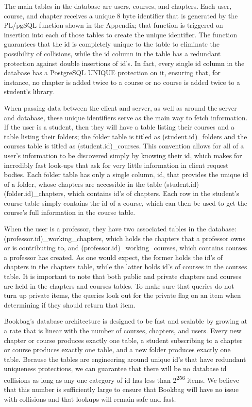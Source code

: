 \documentclass[pageno]{jpaper}
\begin{document}
The main tables in the database are users, courses, and chapters. Each user, course, and chapter receives a unique 8 byte identifier that is generated by the PL/pgSQL function shown in the Appendix; that function is triggered on insertion into each of those tables to create the unique identifier. The function guarantees that the id is completely unique to the table to eliminate the possibility of collisions, while the id column in the table has a redundant protection against double insertions of id's. In fact, every single id column in the database has a PostgreSQL UNIQUE protection on it, ensuring that, for instance, no chapter is added twice to a course or no course is added twice to a student's library.

When passing data between the client and server, as well as around the server and database, these unique identifiers serve as the main way to fetch information. If the user is a student, then they will have a table listing their courses and a table listing their folders; the folder table is titled as (student.id)\_folders and the courses table is titled as (student.id)\_courses. This convention allows for all of a user's information to be discovered simply by knowing their id, which makes for incredibly fast look-ups that ask for very little information in client request bodies. Each folder table has only a single column, id, that provides the unique id of a folder, whose chapters are accessible in the table (student.id)(folder.id)\_chapters, which contains id's of chapters. Each row in the student's course table simply contains the id of a course, which can then be used to get the course's full information in the course table.

When the user is a professor, they have two associated tables in the database: (professor.id)\_working\_chapters, which holds the chapters that a professor owns or is contributing to, and (professor.id)\_working\_courses, which contains courses a professor has created. As one would expect, the former holds the id's of chapters in the chapters table, while the latter holds id's of courses in the courses table. It is important to note that both public and private chapters and courses are held in the chapters and courses tables. To make sure that queries do not turn up private items, the queries look out for the private flag on an item when determining if they should return that item.

Bookbag's database architecture is designed to be fast and scalable by growing at a rate that is linear with the number of courses, chapters, and users. Every new chapter or course produces exactly one table, a student subscribing to a chapter or course produces exactly one table, and a new folder produces exactly one table. Because the tables are engineering around unique id's that have redundant uniqueness protections, we can guarantee that there will be no database id collisions as long as any one category of id has less than 2\textsuperscript{256} items. We believe that this number is sufficiently large to ensure that Bookbag will have no issue with collisions and that lookups will remain safe and fast.
\end{document}
